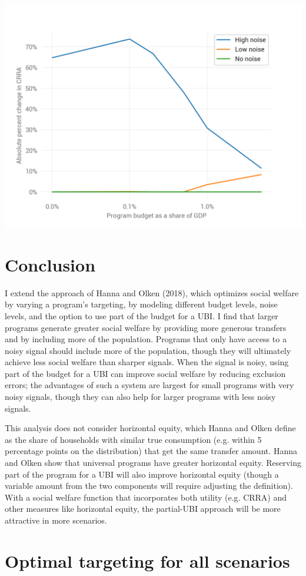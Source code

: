 \documentclass[12pt]{article}
\begin{document}
\begin{center}
	\includegraphics{improvement_from_partial_ubi}  %
	\label{fig:improvement_from_partial_ubi}
\end{center}

\section{Conclusion} \label{sec:conclusion}

I extend the approach of Hanna and Olken (2018), which optimizes social welfare 
by varying a program's targeting, by modeling different budget levels, noise 
levels, and the option to use part of the budget for a UBI. I find that larger 
programs generate greater social welfare by providing more generous transfers 
and by including more of the population. Programs that only have access to a 
noisy signal should include more of the population, though they will ultimately 
achieve less social welfare than sharper signals. When the signal is noisy, 
using part of the budget for a UBI can improve social welfare by reducing 
exclusion errors; the advantages of such a system are largest for small 
programs with very noisy signals, though they can also help for larger programs 
with less noisy signals.

This analysis does not consider horizontal equity, which Hanna and Olken define 
as the share of households with similar true consumption (e.g. within 5 
percentage points on the distribution) that get the same transfer amount. Hanna 
and Olken show that universal programs have greater horizontal equity. 
Reserving part of the program for a UBI will also improve horizontal equity 
(though a variable amount from the two components will require adjusting the 
definition). With a social welfare function that incorporates both utility 
(e.g. CRRA) and other measures like horizontal equity, the partial-UBI approach 
will be more attractive in more scenarios.


\appendix
\section{Optimal targeting for all scenarios} \label{sec:appendix_all_scenarios}


\clearpage


\end{document}
